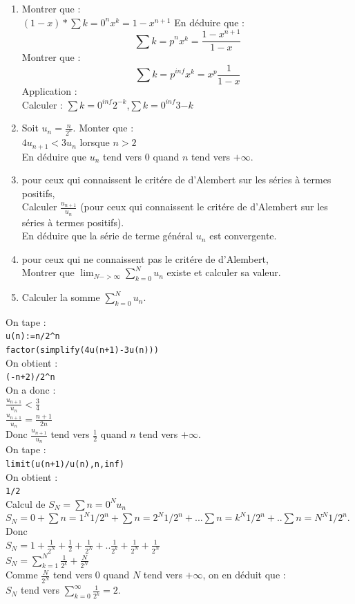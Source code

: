 \documentclass[a4paper,11pt]{book}
\begin{document}
\begin{enumerate}
\item Montrer que :\\
$(1-x)*\sum{k=0}^nx^k=1-x^{n+1}$
En d\'eduire que :
$$\sum{k=p}^nx^k=\frac{1-x^{n+1}}{1-x}$$
Montrer que :
$$\sum{k=p}^{inf}x^k=x^p\frac{1}{1-x}$$
Application :\\
Calculer : $\sum{k=0}^{inf}2^{-k}$,$\sum{k=0}^{inf}3{-k}$ 
\item Soit $u_n=\frac{n}{2^n}$. Monter que :\\
$4u_{n+1}<3u_n$ lorsque $n>2$\\
En d\'eduire que $u_n$ tend vers 0 quand $n$ tend vers $+\infty$.
\item pour ceux qui connaissent le crit\'ere de d'Alembert sur les s\'eries 
\`a termes positifs,\\
Calculer $\frac{u_{n+1}}{u_n}$ (pour ceux qui connaissent le crit\'ere de 
d'Alembert sur les s\'eries \`a termes positifs).\\
En d\'eduire que la s\'erie de terme g\'en\'eral $u_n$ est convergente.
\item pour ceux qui ne connaissent pas le crit\'ere de d'Alembert,\\
Montrer que $\lim_{N->\infty}\sum_{k=0}^{N}u_n$ existe et calculer sa valeur.
\item Calculer la somme $\sum_{k=0}^{N}u_n$.\\
\end{enumerate}
On tape :\\
{\tt u(n):=n/2\verb|^|n}\\
{\tt factor(simplify(4u(n+1)-3u(n)))}\\
On obtient :\\
{\tt (-n+2)/2\verb|^|n}\\
On a donc :\\
$\frac{u_{n+1}}{u_n}<\frac{3}{4}$\\
$\frac{u_{n+1}}{u_n}=\frac{n+1}{2n}$\\
Donc $\frac{u_{n+1}}{u_n}$ tend vers $\frac{1}{2}$ quand $n$ tend vers 
$+\infty$.\\
On tape :\\
{\tt limit(u(n+1)/u(n),n,inf)}\\
On obtient :\\
{\tt 1/2}\\
Calcul de $S_N=\sum{n=0}^{N} u_n$\\
$S_N=0+\sum{n=1}^{N} 1/2^n+\sum{n=2}^{N} 1/2^n+...\sum{n=k}^{N} 1/2^n+..\sum{n=N}^{N} 1/2^n$.\\
Donc\\
$S_N=1+\frac{1}{2^N}+\frac{1}{2}+\frac{1}{2^N}+..\frac{1}{2^k}+\frac{1}{2^N}+\frac{1}{2^N}$\\
$S_N=\sum_{k=1}^N\frac{1}{2^k}+\frac{N}{2^N}$\\
Comme $\frac{N}{2^N}$ tend vers 0 quand $N$ tend vers $+\infty$, on en d\'eduit
 que :\\
$S_N$ tend vers $\sum_{k=0}^{\infty}\frac{1}{2^k}=2$.
\end{document}
